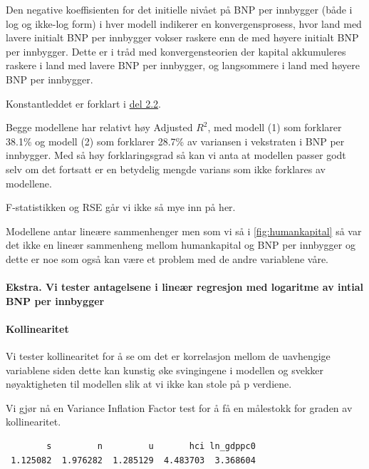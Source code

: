 \documentclass[
  12pt,
  a4paper,
  DIV=11,
  numbers=noendperiod]{scrartcl}
\let\oldparagraph\paragraph
\renewcommand{\paragraph}[1]{\oldparagraph{#1}\mbox{}}
\begin{document}
Den negative koeffisienten for det initielle nivået på BNP per innbygger
(både i log og ikke-log form) i hver modell indikerer en
konvergensprosess, hvor land med lavere initialt BNP per innbygger
vokser raskere enn de med høyere initialt BNP per innbygger. Dette er i
tråd med konvergensteorien der kapital akkumuleres raskere i land med
lavere BNP per innbygger, og langsommere i land med høyere BNP per
innbygger.

Konstantleddet er forklart i
\hyperref[c.-tolke-resultatene-fra-spredningsdiagrammen-og-regresjonsanalysen.]{del 2.2}.

Begge modellene har relativt høy Adjusted \(R^2\), med modell (1) som
forklarer 38.1\% og modell (2) som forklarer 28.7\% av variansen i
vekstraten i BNP per innbygger. Med så høy forklaringsgrad så kan vi
anta at modellen passer godt selv om det fortsatt er en betydelig mengde
varians som ikke forklares av modellene.

F-statistikken og RSE går vi ikke så mye inn på her.

Modellene antar lineære sammenhenger men som vi så i
\autoref{fig:humankapital} så var det ikke en lineær sammenheng mellom
humankapital og BNP per innbygger og dette er noe som også kan være et
problem med de andre variablene våre.

\clearpage

\paragraph{Ekstra. Vi tester antagelsene i lineær regresjon med
logaritme av intial BNP per
innbygger}\label{ekstra.-vi-tester-antagelsene-i-lineuxe6r-regresjon-med-logaritme-av-intial-bnp-per-innbygger}

\paragraph{Kollinearitet}\label{kollinearitet}

Vi tester kollinearitet for å se om det er korrelasjon mellom de
uavhengige variablene siden dette kan kunstig øke svingingene i modellen
og svekker nøyaktigheten til modellen slik at vi ikke kan stole på p
verdiene.

Vi gjør nå en Variance Inflation Factor test for å få en målestokk for
graden av kollinearitet.

\begin{verbatim}
        s         n         u       hci ln_gdppc0 
 1.125082  1.976282  1.285129  4.483703  3.368604 
\end{verbatim}
\end{document}
